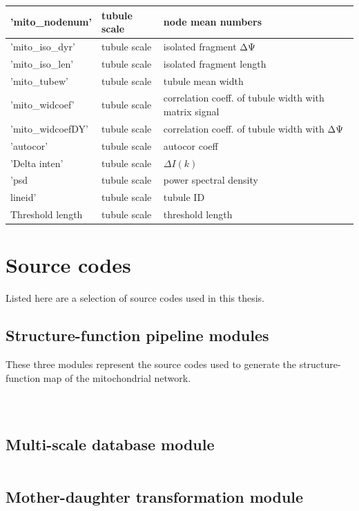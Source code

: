 \begin{longtable}{|l|l|l|}
	 'mito\_nodenum' & tubule scale & node mean numbers \\ \hline
	 'mito\_iso\_dyr' & tubule scale & isolated fragment ΔΨ \\ \hline
	 'mito\_iso\_len' & tubule scale & isolated fragment length \\ \hline
	 'mito\_tubew' & tubule scale & tubule mean width \\ \hline
	 'mito\_widcoef' & tubule scale & correlation coeff. of tubule width with matrix signal \\ \hline
	 'mito\_widcoefDY' & tubule scale & correlation coeff. of tubule width with ΔΨ \\ \hline
	'autocor' & tubule scale & autocor coeff \\ \hline
	'Delta inten' & tubule scale & $ΔI(k)$ \\ \hline
	'psd & tubule scale & power spectral density \\ \hline
	lineid' & tubule scale & tubule ID \\ \hline
	Threshold length & tubule scale & threshold length \\ \hline
\end{longtable}
\endgroup

\chapter{Source codes}
Listed here are a selection of source codes used in this thesis. 
\section{Structure-function pipeline modules}\label{pipecode}
These three modules represent the source codes used to generate the structure-function map of the mitochondrial network.
\inputminted[xleftmargin=2em, linenos, breaklines, fontsize=\footnotesize, baselinestretch=1, stepnumber=5]{Python}{steponepipeline.py}
%
\inputminted[xleftmargin=2em,fontsize=\footnotesize, baselinestretch=.9,linenos,stepnumber=5]{Python}{steptwopipeline.py}
%
\inputminted[xleftmargin=2em,fontsize=\footnotesize, baselinestretch=.9,linenos,stepnumber=5]{Python}{steptreepipeline.py}
%
\section{Multi-scale database module}\label{dbcode}
\inputminted[xleftmargin=2em,fontsize=\footnotesize, baselinestretch=.9,linenos,stepnumber=5, lastline=323]{Python}{mungedata.py}
\section{Mother-daughter transformation module}\label{mbcode}
\inputminted[xleftmargin=2em,fontsize=\footnotesize, baselinestretch=.9,linenos,stepnumber=5]{Python}{transformbud.py}

